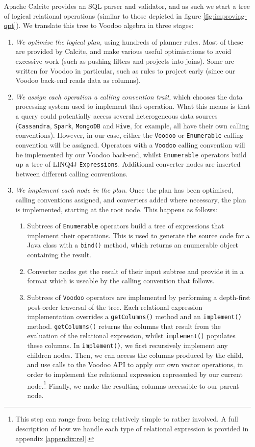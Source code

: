 Apache Calcite provides an SQL parser and validator, and as such we start a tree of logical relational operations (similar to those depicted in figure \ref{fig:improving-qpt}). We translate this tree to Voodoo algebra in three stages:
\begin{enumerate}
    \item \emph{We optimise the logical plan}, using hundreds of planner rules. Most of these are provided by Calcite, and make various useful optimisations to avoid excessive work (such as pushing filters and projects into joins). Some are written for Voodoo in particular, such as rules to project early (since our Voodoo back-end reads data as columns).
    \item \emph{We assign each operation a calling convention trait}, which chooses the data processing system used to implement that operation. What this means is that a query could potentially access several heterogeneous data sources (\texttt{Cassandra}, \texttt{Spark}, \texttt{MongoDB} and \texttt{Hive}, for example, all have their own calling conventions). However, in our case, either the \texttt{Voodoo} or \texttt{Enumerable} calling convention will be assigned. Operators with a \texttt{Voodoo} calling convention will be implemented by our Voodoo back-end, whilst \texttt{Enumerable} operators build up a tree of LINQ4J \texttt{Expressions}. Additional converter nodes are inserted between different calling conventions.
    \item \emph{We implement each node in the plan}. Once the plan has been optimised, calling conventions assigned, and converters added where necessary, the plan is implemented, starting at the root node. This happens as follows:
    \begin{enumerate}
        \item Subtrees of \texttt{Enumerable} operators build a tree of expressions that implement their operations. This is used to generate the source code for a Java class with a \texttt{bind()} method, which returns an enumerable object containing the result.
        \item Converter nodes get the result of their input subtree and provide it in a format which is useable by the calling convention that follows.
        \item Subtrees of \texttt{Voodoo} operators are implemented by performing a depth-first post-order traversal of the tree. Each relational expression implementation overrides a \texttt{getColumns()} method and an \texttt{implement()} method. \texttt{getColumns()} returns the columns that result from the evaluation of the relational expression, whilst \texttt{implement()} populates these columns. In \texttt{implement()}, we first recursively implement any children nodes. Then, we can access the columns produced by the child, and use calls to the Voodoo API to apply our own vector operations, in order to implement the relational expression represented by our current node.\footnote{This step can range from being relatively simple to rather involved. A full description of how we handle each type of relational expression is provided in appendix \ref{appendix:rel}.} Finally, we make the resulting columns accessible to our parent node.

\end{enumerate}
\end{enumerate}
